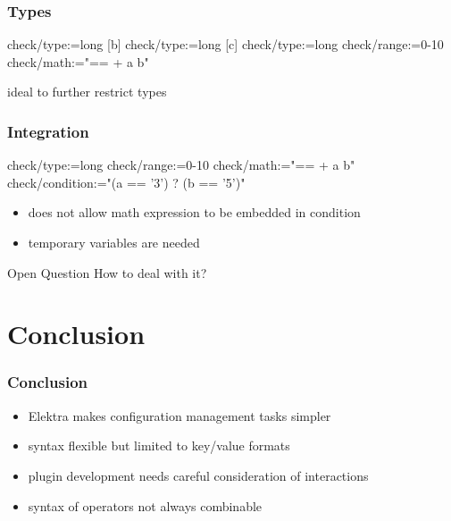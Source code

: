 \begin{frame}[fragile]
	\frametitle{Types}

	\begin{code}[morekeywords={check,type,range,math},gobble=4]
	[a]
	  check/type:=long
	[b]
	  check/type:=long
	[c]
	  check/type:=long
	  check/range:=0-10
	  check/math:="== + a b"
	\end{code}

	ideal to further restrict types
\end{frame}

\begin{frame}[fragile]
	\frametitle{Integration}

	\begin{code}[morekeywords={check,type,range,math},gobble=4]
	[c]
	  check/type:=long
	  check/range:=0-10
	  check/math:="== + a b"
	  check/condition:="(a == '3') ? (b == '5')"
	\end{code}

	\begin{itemize}
	\item does not allow math expression to be embedded in condition
	\item temporary variables are needed
	\end{itemize}

	\begin{alertblock}{Open Question}
	How to deal with it?
	\end{alertblock}
\end{frame}


\section{Conclusion}

\begin{frame}
	\frametitle{Conclusion}
	\begin{itemize}
	\item Elektra makes configuration management tasks simpler
	\item syntax flexible but limited to key/value formats
	\item plugin development needs careful consideration of interactions
	\item syntax of operators not always combinable
	\end{itemize}
\end{frame}



\nocite{raab2017introducing}

\appendix

\begin{frame}[allowframebreaks]
	
	
\end{frame}




